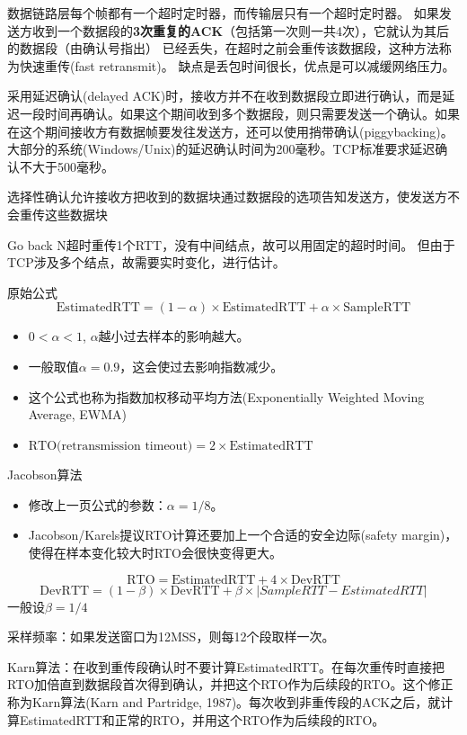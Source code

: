 数据链路层每个帧都有一个超时定时器，而传输层只有一个超时定时器。
如果发送方收到一个数据段的\textbf{3次重复的ACK}（包括第一次则一共4次），它就认为其后的数据段（由确认号指出） 已经丢失，在超时之前会重传该数据段，这种方法称为快速重传(fast retransmit)。
缺点是丢包时间很长，优点是可以减缓网络压力。

采用延迟确认(delayed ACK)时，接收方并不在收到数据段立即进行确认，而是延迟一段时间再确认。如果这个期间收到多个数据段，则只需要发送一个确认。如果在这个期间接收方有数据帧要发往发送方，还可以使用捎带确认(piggybacking)。
大部分的系统(Windows/Unix)的延迟确认时间为200毫秒。TCP标准要求延迟确认不大于500毫秒。

选择性确认允许接收方把收到的数据块通过数据段的选项告知发送方，使发送方不会重传这些数据块

Go back N超时重传1个RTT，没有中间结点，故可以用固定的超时时间。
但由于TCP涉及多个结点，故需要实时变化，进行估计。

原始公式
\[\text{EstimatedRTT} = (1-\alpha)\times \text{EstimatedRTT} + \alpha \times \text{SampleRTT}\]
\begin{itemize}
    \item $0<\alpha<1$, $\alpha$越小过去样本的影响越大。
    \item 一般取值$\alpha=0.9$，这会使过去影响指数减少。
    \item 这个公式也称为指数加权移动平均方法(Exponentially Weighted Moving Average, EWMA)
    \item $\text{RTO(retransmission timeout)} = 2\times \text{EstimatedRTT}$
\end{itemize}

Jacobson算法
\begin{itemize}
    \item 修改上一页公式的参数：$\alpha=1/8$。
    \item Jacobson/Karels提议RTO计算还要加上一个合适的安全边际(safety margin)，使得在样本变化较大时RTO会很快变得更大。
\end{itemize}
\[\text{RTO} = \text{EstimatedRTT} + 4\times \text{DevRTT}\]
\[\text{DevRTT} =(1-\beta)\times\text{DevRTT} + \beta\times|SampleRTT-EstimatedRTT|\]
一般设$\beta = 1/4$

采样频率：如果发送窗口为12MSS，则每12个段取样一次。

Karn算法：在收到重传段确认时不要计算EstimatedRTT。在每次重传时直接把RTO加倍直到数据段首次得到确认，并把这个RTO作为后续段的RTO。这个修正称为Karn算法(Karn and Partridge, 1987)。每次收到非重传段的ACK之后，就计算EstimatedRTT和正常的RTO，并用这个RTO作为后续段的RTO。


